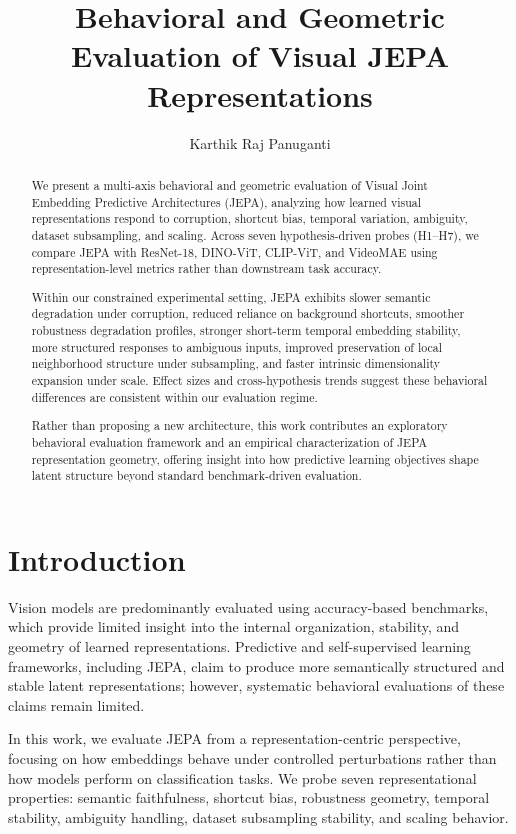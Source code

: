\documentclass[10pt,twocolumn]{article}
\title{Behavioral and Geometric Evaluation of Visual JEPA Representations}
\author{Karthik Raj Panuganti}
\date{}
\begin{document}
\maketitle

\begin{abstract}
We present a multi-axis behavioral and geometric evaluation of Visual Joint Embedding Predictive Architectures (JEPA), analyzing how learned visual representations respond to corruption, shortcut bias, temporal variation, ambiguity, dataset subsampling, and scaling. Across seven hypothesis-driven probes (H1–H7), we compare JEPA with ResNet-18, DINO-ViT, CLIP-ViT, and VideoMAE using representation-level metrics rather than downstream task accuracy.

Within our constrained experimental setting, JEPA exhibits slower semantic degradation under corruption, reduced reliance on background shortcuts, smoother robustness degradation profiles, stronger short-term temporal embedding stability, more structured responses to ambiguous inputs, improved preservation of local neighborhood structure under subsampling, and faster intrinsic dimensionality expansion under scale. Effect sizes and cross-hypothesis trends suggest these behavioral differences are consistent within our evaluation regime.

Rather than proposing a new architecture, this work contributes an exploratory behavioral evaluation framework and an empirical characterization of JEPA representation geometry, offering insight into how predictive learning objectives shape latent structure beyond standard benchmark-driven evaluation.
\end{abstract}

\section{Introduction}
Vision models are predominantly evaluated using accuracy-based benchmarks, which provide limited insight into the internal organization, stability, and geometry of learned representations. Predictive and self-supervised learning frameworks, including JEPA, claim to produce more semantically structured and stable latent representations; however, systematic behavioral evaluations of these claims remain limited.

In this work, we evaluate JEPA from a representation-centric perspective, focusing on how embeddings behave under controlled perturbations rather than how models perform on classification tasks. We probe seven representational properties: semantic faithfulness, shortcut bias, robustness geometry, temporal stability, ambiguity handling, dataset subsampling stability, and scaling behavior.
\end{document}
